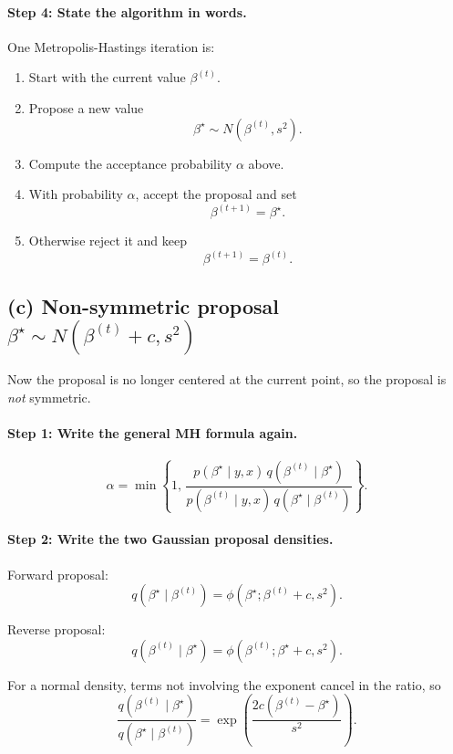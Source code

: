 \documentclass[11pt]{article}
\begin{document}
\paragraph{Step 4: State the algorithm in words.}

One Metropolis-Hastings iteration is:
\begin{enumerate}[leftmargin=1.8em]
    \item Start with the current value $\beta^{(t)}$.
    \item Propose a new value
    \[
    \beta^\star\sim N(\beta^{(t)},s^2).
    \]
    \item Compute the acceptance probability $\alpha$ above.
    \item With probability $\alpha$, accept the proposal and set
    \[
    \beta^{(t+1)}=\beta^\star.
    \]
    \item Otherwise reject it and keep
    \[
    \beta^{(t+1)}=\beta^{(t)}.
    \]
\end{enumerate}

\subsection*{(c) Non-symmetric proposal $\beta^\star\sim N(\beta^{(t)}+c,s^2)$}

Now the proposal is no longer centered at the current point, so the proposal is \emph{not} symmetric.

\paragraph{Step 1: Write the general MH formula again.}

\[
\alpha
=
\min\left\{
1,\,
\frac{p(\beta^\star\mid y,x)\,q(\beta^{(t)}\mid \beta^\star)}
{p(\beta^{(t)}\mid y,x)\,q(\beta^\star\mid \beta^{(t)})}
\right\}.
\]

\paragraph{Step 2: Write the two Gaussian proposal densities.}

Forward proposal:
\[
q(\beta^\star\mid \beta^{(t)})
=
\phi(\beta^\star;\beta^{(t)}+c,s^2).
\]

Reverse proposal:
\[
q(\beta^{(t)}\mid \beta^\star)
=
\phi(\beta^{(t)};\beta^\star+c,s^2).
\]

For a normal density, terms not involving the exponent cancel in the ratio, so
\[
\frac{q(\beta^{(t)}\mid \beta^\star)}{q(\beta^\star\mid \beta^{(t)})}
=
\exp\left(
\frac{2c(\beta^{(t)}-\beta^\star)}{s^2}
\right).
\]
\end{document}
